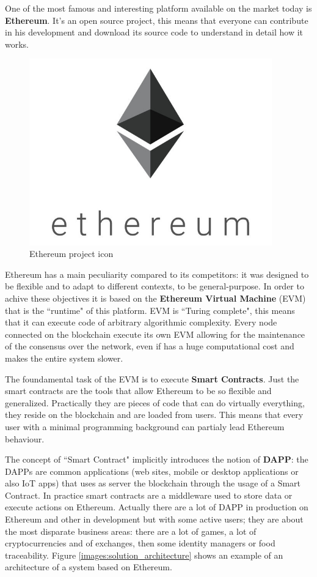 One of the most famous and interesting platform available on the market today is \textbf{Ethereum}. It's 
an open source project, this means that everyone can contribute in his development and download its source 
code to understand in detail how it works.
\begin{figure}[!ht]
    \centering
\includegraphics[width=105mm]{images/ethereum.jpg}
    \caption{Ethereum project icon}
    \label{images:ethereum}
\end{figure}
Ethereum has a main peculiarity compared to its competitors: it was designed to be flexible and to adapt to 
different contexts, to be general-purpose.
In order to achive these objectives it is based on the \textbf{Ethereum Virtual Machine} (EVM) that is 
the ``runtime" of this platform. EVM is ``Turing complete", this means that it can execute code of arbitrary 
algorithmic complexity. Every node connected on the blockchain execute its own EVM allowing for the 
maintenance of the consensus over the network, even if has a huge computational cost and makes the entire 
system slower.

The foundamental task of the EVM is to execute \textbf{Smart Contracts}.
Just the smart contracts are the tools that allow Ethereum to be so flexible and generalized. Practically 
they are pieces of code that can do virtually everything, they reside on the blockchain and are loaded 
from users. This means that every user with a minimal programming background can partialy lead Ethereum 
behaviour.

The concept of ``Smart Contract" implicitly introduces the notion of \textbf{DAPP}: the DAPPs are common applications (web 
sites, mobile or desktop applications or also IoT apps) that uses as server the blockchain through the usage of a Smart 
Contract. In practice smart contracts are a middleware used to store data or execute actions on Ethereum. Actually there are 
a lot of DAPP in production on Ethereum and other in development but with some active users; they are about the most disparate 
business areas: there are a lot of games, a lot of cryptocurrencies and of exchanges, then some identity managers or food 
traceability. Figure \ref{images:solution_architecture} shows an example of an architecture of a system based on Ethereum.

